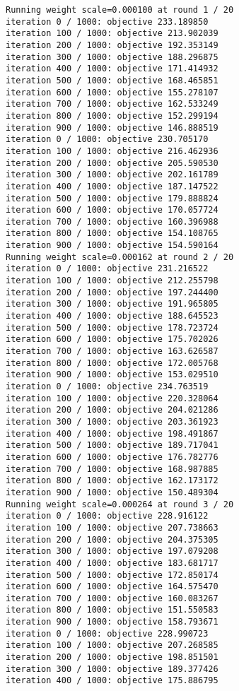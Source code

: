 \documentclass[11pt]{article}
\begin{document}
    \begin{Verbatim}[commandchars=\\\{\}]
Running weight scale=0.000100 at round 1 / 20
iteration 0 / 1000: objective 233.189850
iteration 100 / 1000: objective 213.902039
iteration 200 / 1000: objective 192.353149
iteration 300 / 1000: objective 188.296875
iteration 400 / 1000: objective 171.414932
iteration 500 / 1000: objective 168.465851
iteration 600 / 1000: objective 155.278107
iteration 700 / 1000: objective 162.533249
iteration 800 / 1000: objective 152.299194
iteration 900 / 1000: objective 146.888519
iteration 0 / 1000: objective 230.705170
iteration 100 / 1000: objective 216.462936
iteration 200 / 1000: objective 205.590530
iteration 300 / 1000: objective 202.161789
iteration 400 / 1000: objective 187.147522
iteration 500 / 1000: objective 179.888824
iteration 600 / 1000: objective 170.057724
iteration 700 / 1000: objective 160.396988
iteration 800 / 1000: objective 154.108765
iteration 900 / 1000: objective 154.590164
Running weight scale=0.000162 at round 2 / 20
iteration 0 / 1000: objective 231.216522
iteration 100 / 1000: objective 212.255798
iteration 200 / 1000: objective 197.244400
iteration 300 / 1000: objective 191.965805
iteration 400 / 1000: objective 188.645523
iteration 500 / 1000: objective 178.723724
iteration 600 / 1000: objective 175.702026
iteration 700 / 1000: objective 163.626587
iteration 800 / 1000: objective 172.005768
iteration 900 / 1000: objective 153.029510
iteration 0 / 1000: objective 234.763519
iteration 100 / 1000: objective 220.328064
iteration 200 / 1000: objective 204.021286
iteration 300 / 1000: objective 203.361923
iteration 400 / 1000: objective 198.491867
iteration 500 / 1000: objective 189.717041
iteration 600 / 1000: objective 176.782776
iteration 700 / 1000: objective 168.987885
iteration 800 / 1000: objective 162.173172
iteration 900 / 1000: objective 150.489304
Running weight scale=0.000264 at round 3 / 20
iteration 0 / 1000: objective 228.916122
iteration 100 / 1000: objective 207.738663
iteration 200 / 1000: objective 204.375305
iteration 300 / 1000: objective 197.079208
iteration 400 / 1000: objective 183.681717
iteration 500 / 1000: objective 172.850174
iteration 600 / 1000: objective 164.575470
iteration 700 / 1000: objective 160.083267
iteration 800 / 1000: objective 151.550583
iteration 900 / 1000: objective 158.793671
iteration 0 / 1000: objective 228.990723
iteration 100 / 1000: objective 207.268585
iteration 200 / 1000: objective 198.851501
iteration 300 / 1000: objective 189.377426
iteration 400 / 1000: objective 175.886795

\end{Verbatim}
\end{document}
